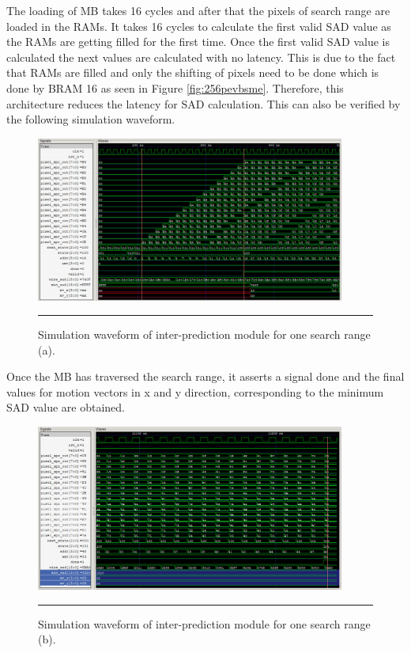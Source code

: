 The loading of MB takes 16 cycles and after that the pixels of search range are loaded in the RAMs. It takes 16 cycles to calculate the first valid SAD value as the RAMs are getting filled for the first time. Once the first valid SAD value is calculated the next values are calculated with no latency. This is due to the fact that RAMs are filled and only the shifting of pixels need to be done which is done by BRAM 16 as seen in Figure \ref{fig:256pevbsme}. Therefore, this architecture reduces the latency for SAD calculation. This can also be verified by the following simulation waveform.
\begin{figure}[H]
	\centering
	\includegraphics[width = 4in]{./Figures/wave3.png}
	\rule{35em}{0.5pt}
	\caption{Simulation waveform of inter-prediction module for one search range (a).}
	\label{fig:wave3}
\end{figure}
Once the MB has traversed the search range, it asserts a signal done and the final values for motion vectors in x and y direction, corresponding to the minimum SAD value are obtained. 
\begin{figure}[H]
	\centering
	\includegraphics[width = 4in]{./Figures/wave2.png}
	\rule{35em}{0.5pt}
	\caption{Simulation waveform of inter-prediction module for one search range (b).}
	\label{fig:wave2}
\end{figure}

